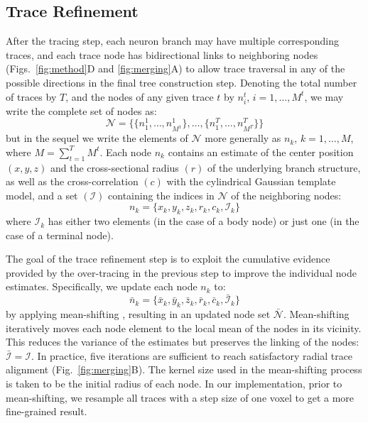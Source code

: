 \subsection{Trace Refinement}
\label{subsec:trace-refinement}
After the tracing step, each neuron branch may have multiple corresponding traces, and each trace node has bidirectional links to neighboring nodes (Figs.~\ref{fig:method}D and \ref{fig:merging}A) to allow trace traversal in any of the possible directions in the final tree construction step. Denoting the total number of traces by $T$, and the nodes of any given trace $t$ by $n_i^t$, $i=1,\dots,M^t$, we may write the complete set of nodes as:
\begin{equation}
\label{eq:N}
\mathcal{N} = \bigg\{
\Big\{ n_1^1,\dots,n_{M^1}^1\Big\},
\dots,
\Big\{ n_1^T,\dots,n_{M^T}^T\Big\}
\bigg\}
\end{equation}
but in the sequel we write the elements of $\mathcal{N}$ more generally as $n_k$, $k=1,\dots,M$, where $M=\sum_{t=1}^{T}M^t$. Each node $n_k$ contains an estimate of the center position $\left(x,y,z\right)$ and the cross-sectional radius $\left(r\right)$ of the underlying branch structure, as well as the cross-correlation $\left(c\right)$ with the cylindrical Gaussian template model, and a set $\left( \mathcal{I} \right)$ containing the indices in $\mathcal{N}$ of the neighboring nodes:
\begin{equation}
\label{eq:n_k}
n_k = \lbrace x_k, y_k, z_k, r_k, c_k, \mathcal{I}_k \rbrace
\end{equation}
where $\mathcal{I}_k$ has either two elements (in the case of a body node) or just one (in the case of a terminal node).

The goal of the trace refinement step is to exploit the cumulative evidence provided by the over-tracing in the previous step to improve the individual node estimates. Specifically, we update each node $n_k$ to:
\begin{equation}
\label{eq:bar_n_k}
\bar{n}_k = \lbrace \bar{x}_k, \bar{y}_k, \bar{z}_k, \bar{r}_k, \bar{c}_k, \bar{\mathcal{I}}_k \rbrace
\end{equation}
by applying mean-shifting \citep{cheng1995mean}, resulting in an updated node set $\bar{\mathcal{N}}$. Mean-shifting iteratively moves each node element to the local mean of the nodes in its vicinity. This reduces the variance of the estimates but preserves the linking of the nodes: $\bar{\mathcal{I}}=\mathcal{I}$. In practice, five iterations are sufficient to reach satisfactory radial trace alignment (Fig.~\ref{fig:merging}B). The kernel size used in the mean-shifting process is taken to be the initial radius of each node. In our implementation, prior to mean-shifting, we resample all traces with a step size of one voxel to get a more fine-grained result.


